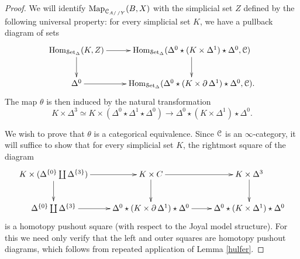 \begin{proof}
We will identify $\operatorname{{Map}}_{ \operatorname{\mathcal{C}}_{A/ \, /Y}}(B,X)$ with the simplicial set $Z$ defined by the following universal property: for every simplicial set $K$, we have a pullback diagram of sets
$$ \xymatrix{ \Hom_{\sSet}(K, Z) \ar[r] \ar[d] & \Hom_{\sSet}( \Delta^0 \star (K \times \Delta^1) \star \Delta^0, \calC) \ar[d] \\
\Delta^0 \ar[r] & \Hom_{\sSet}( \Delta^0 \star (K \times \bd \Delta^1) \star \Delta^0, \calC). }$$
The map $\theta$ is then induced by the natural transformation
$$ K \times \Delta^3 \simeq K \times ( \Delta^0 \star \Delta^1 \star \Delta^0)
\rightarrow \Delta^0 \star (K \times \Delta^1) \star \Delta^0.$$

We wish to prove that $\theta$ is a categorical equivalence. Since $\operatorname{\mathcal{C}}$ is an
$\infty$-category, it will suffice to show that for every simplicial set $K$, the rightmost square of the diagram
$$ \xymatrix{ K \times ( \Delta^{ \{0\} } \coprod \Delta^{ \{3 \} }) \ar[r] \ar[d] & K \times C \ar[r] \ar[d] & K \times \Delta^3 \ar[d] \\
\Delta^{ \{0\} } \coprod \Delta^{ \{3\} } \ar[r] & \Delta^0 \star (K \times \bd \Delta^1) \star \Delta^0 \ar[r] & \Delta^0
\star (K \times \Delta^1) \star \Delta^0 }$$
is a homotopy pushout square (with respect to the Joyal model structure). For this we need only verify that the left and outer squares are homotopy pushout diagrams, which follows from repeated application of Lemma \ref{hulfer}.
\end{proof}

